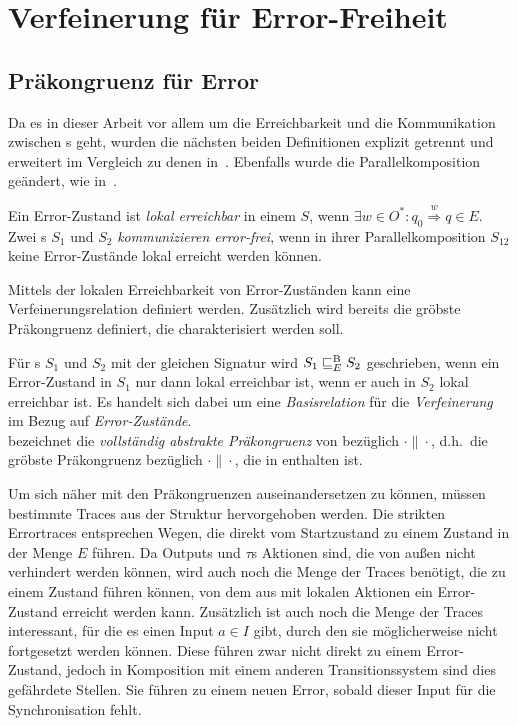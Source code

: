 \chapter{Verfeinerung für Error-Freiheit}

\section{Präkongruenz für Error}

Da es in dieser Arbeit vor allem um die Erreichbarkeit und die Kommunikation
zwischen \EIO{}s geht, wurden die nächsten beiden Definitionen explizit
getrennt und erweitert im Vergleich zu denen in~\cite{Vogler2014EIO}. Ebenfalls
wurde die Parallelkomposition geändert, wie in~\cite{Schlosser2012BA}.

\begin{Def}
  Ein Error-Zustand ist \emph{lokal erreichbar} in einem \EIO{} $S$, wenn $\exists w\in O^*: q_0
  \overset{w}{\Rightarrow} q\in E$.\\
  Zwei \EIO{}s $S_1$ und $S_2$ \emph{kommunizieren error-frei}, wenn in ihrer
  Parallelkomposition $S_{12}$ keine Error-Zustände lokal erreicht werden können.
\end{Def}

Mittels der lokalen Erreichbarkeit von Error-Zuständen kann eine
Verfeinerungsrelation definiert werden. Zusätzlich wird bereits die
gröbste Präkongruenz definiert, die charakterisiert werden soll.

\begin{Def}
\label{DefErrorBasisrel}
  Für \EIO{}s $S_1$ und $S_2$ mit der gleichen Signatur wird
  $S_1\sqsubseteq _E^\mathrm{B} S_2$ geschrieben, wenn ein Error-Zustand in $S_1$ nur dann lokal erreichbar ist, wenn er
  auch in $S_2$ lokal erreichbar ist. Es handelt sich dabei um eine
  \emph{Basisrelation} für die \emph{Verfeinerung} im Bezug auf
  \emph{Error-Zustände}.\\
  \ECRel{} bezeichnet die \emph{vollständig abstrakte Präkongruenz} von \EBRel{}
  bezüglich $\cdot\|\cdot$, d.h.\ die gröbste Präkongruenz bezüglich
  $\cdot\|\cdot$, die in \EBRel{} enthalten ist.
\end{Def}

Um sich näher mit den Präkongruenzen auseinandersetzen zu können, müssen bestimmte Traces
aus der Struktur hervorgehoben werden. Die strikten Errortraces entsprechen Wegen, die
direkt vom Startzustand zu einem Zustand in der Menge $E$ führen. Da Outputs
und $\tau$s Aktionen
sind, die von außen nicht verhindert werden können, wird auch noch die
Menge der Traces benötigt, die zu einem Zustand führen können, von dem aus mit lokalen Aktionen
ein Error-Zustand erreicht werden kann. Zusätzlich ist auch noch die Menge der Traces
interessant, für die es einen Input $a\in I$ gibt, durch den sie möglicherweise nicht
fortgesetzt werden können. Diese führen zwar nicht direkt zu einem
Error-Zustand,
jedoch in Komposition mit einem anderen Transitionssystem sind
dies gefährdete Stellen. Sie führen zu einem neuen Error, sobald dieser Input
für die Synchronisation fehlt.

